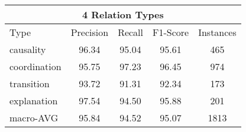 \begin{table}[!htbp]
\centering
\begin{tabular}{|l|c|c|c|c|}
\hline

\multicolumn{5}{|c|}{4 Relation Types}                                              \\ \hline
    Type                &     Precision &     Recall &     F1-Score &     Instances \\ \hline
    causality           &     96.34     &     95.04  &     95.61    &     465       \\ \hline
    coordination        &     95.75     &     97.23  &     96.45    &     974       \\ \hline
    transition          &     93.72     &     91.31  &     92.34    &     173       \\ \hline
    explanation         &     97.54     &     94.50  &     95.88    &     201       \\ \hline
    macro-AVG           &     95.84     &     94.52  &     95.07    &     1813      \\ \hline


\end{tabular}
\end{table}
